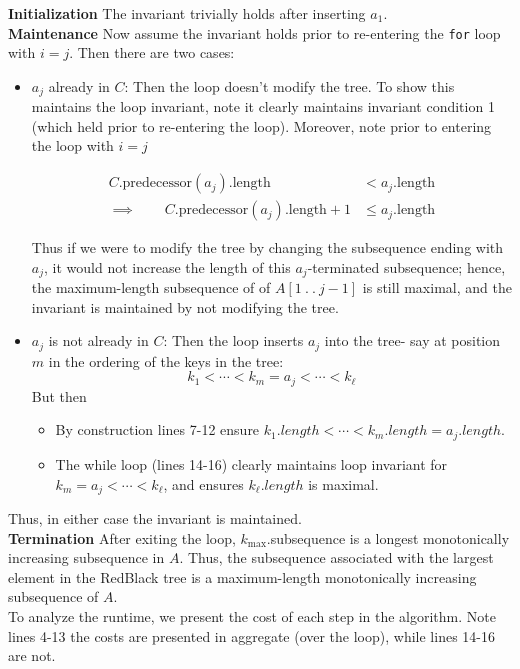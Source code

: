 \documentclass[paper=a4, fontsize=11pt]{scrartcl} %
\numberwithin{equation}{section} %
\numberwithin{figure}{section} %
\numberwithin{table}{section} %
\begin{document}
\textbf{Initialization}
The invariant trivially holds after inserting $a_1$.\\
\textbf{Maintenance} 
Now assume the invariant holds prior to re-entering the \texttt{for} loop with $i = j$. Then there are two cases:
\begin{itemize}
\item $a_j$ already in $C$: Then the loop doesn't modify the tree. To show this maintains the loop invariant, note it clearly maintains invariant condition 1 (which held prior to re-entering the loop). Moreover, note prior to entering the loop with $i = j$

\begin{align*}
C.\textrm{predecessor}(a_j).\textrm{length} &< a_j.\textrm{length} \\
\implies \qquad{} C.\textrm{predecessor}(a_j).\textrm{length} + 1 &\leq a_j.\textrm{length}
\end{align*}

Thus if we were to modify the tree by changing the subsequence ending with $a_j$, it would not increase the length of this $a_j$-terminated subsequence; hence, the maximum-length subsequence of of $A[1~.~.~j-1]$ is still maximal, and the invariant is maintained by not modifying the tree.
\item $a_j$ is not already in $C$: Then the loop inserts $a_j$ into the tree- say at position $m$ in the ordering of the keys in the tree:
\[k_1 < \cdots < k_m = a_j < \cdots < k_\ell\]
But then
\begin{itemize}
\item By construction lines 7-12 ensure $k_1.length < \cdots < k_m.length  = a_j.length$.
\item The while loop (lines 14-16) clearly maintains loop invariant for\\ $k_m = a_j < \cdots < k_\ell$, and ensures $k_\ell.length$ is maximal. 
\end{itemize}
\end{itemize}
Thus, in either case the invariant is maintained.\\
\textbf{Termination}
After exiting the loop, $k_{\max}$.subsequence is a longest monotonically increasing subsequence in $A$. Thus, the subsequence associated with the largest element in the RedBlack tree is a maximum-length monotonically increasing subsequence of $A$. \\

To analyze the runtime, we present the cost of each step in the algorithm. Note lines 4-13 the costs are presented in aggregate (over the loop), while lines 14-16 are not.\\
\end{document}
